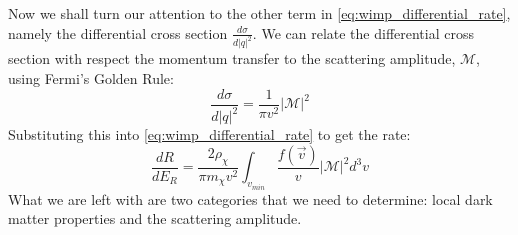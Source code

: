 Now we shall turn our attention to the other term in \autoref{eq:wimp_differential_rate}, namely the differential cross section $\frac{d\sigma}{d|q|^2}$.
We can relate the differential cross section with respect the momentum transfer to the scattering amplitude, $\mathcal{M}$, using Fermi's Golden Rule:
\begin{equation}
    \frac{d\sigma}{d|q|^2} = \frac{1}{\pi v^2} |\mathcal{M}|^2
    \label{eq:fermi_golden_rule_for_cross_section}
\end{equation}
Substituting this into \autoref{eq:wimp_differential_rate} to get the rate: 
\begin{equation}
    \frac{dR}{dE_R} = \frac{2\rho_{\chi}}{\pi m_{\chi} v^2} \int_{v_{min}} \frac{f(\vec{v})}{v} | \mathcal{M} |^2 d^3v
    \label{eq:wimp_differential_rate_scattering_amplitude}
\end{equation}
What we are left with are two categories that we need to determine: local dark matter properties and the scattering amplitude.

